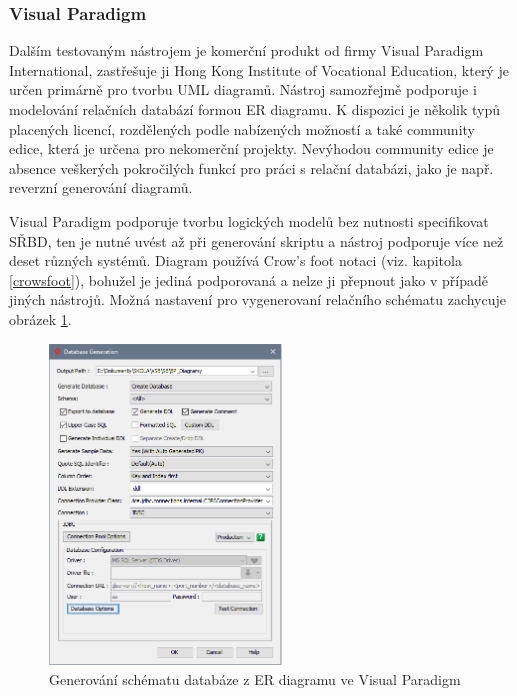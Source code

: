 \documentclass[czech,bachelor,public,dept460,male,oneside]{diploma}
\begin{document}
		\subsubsection{Visual Paradigm}
		Dalším testovaným nástrojem je komerční produkt od firmy Visual Paradigm International, zastřešuje ji Hong Kong Institute of Vocational Education, který je určen primárně pro tvorbu UML diagramů. Nástroj samozřejmě podporuje i modelování relačních databází formou ER diagramu. K dispozici je několik typů placených licencí, rozdělených podle nabízených možností a také community edice, která je určena pro nekomerční projekty. Nevýhodou community edice je absence veškerých pokročilých funkcí pro práci s relační databázi, jako je např. reverzní generování diagramů.
		
		Visual Paradigm podporuje tvorbu logických modelů bez nutnosti specifikovat SŘBD, ten je nutné uvést až při generování skriptu a nástroj podporuje více než deset různých systémů. Diagram používá Crow's foot notaci (viz. kapitola \ref{crowsfoot}), bohužel je jediná podporovaná a nelze ji přepnout jako v případě jiných nástrojů. Možná nastavení pro vygenerovaní relačního schématu zachycuje obrázek \ref{fig:editVP}.
		
		\begin{figure}[H]
			\centering
			\includegraphics[width=0.55\textwidth]{Figures/EditorVP}
			\caption[Generování schématu databáze z ER diagramu ve Visual Paradigm]{Generování schématu databáze z ER diagramu ve Visual Paradigm}
			\label{fig:editVP}
		\end{figure}
		
\end{document}
